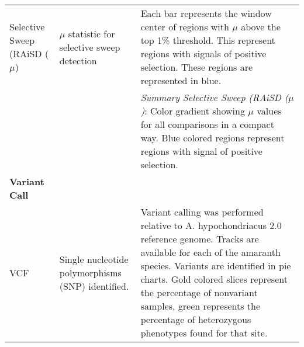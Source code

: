 \documentclass[9pt,twocolumn,twoside]{celabRxiv}
\begin{document}
\begin{longtable}{p{2cm}p{5cm}p{9cm}}
Selective Sweep (RAiSD ($\mu$) & $\mu$ statistic for selective sweep detection & Each bar represents the window center of regions with $\mu$ above the top 1\% threshold. This represent regions with signals of positive selection. These regions are represented in blue.\\
& & 	\textit{Summary Selective Sweep (RAiSD ($\mu$)}: Color gradient showing $\mu$ values for all comparisons in a compact way. Blue colored regions represent regions with signal of positive selection.\\
\textbf{Variant Call} & &\\
\hline
VCF & Single nucleotide polymorphisms (SNP) identified.& Variant calling was performed relative to A. hypochondriacus 2.0 reference genome\citep{lightfoot2017single}. Tracks are available for each of the amaranth species. Variants are identified in pie charts. Gold colored slices represent the percentage of nonvariant samples, green represents the percentage of heterozygous phenotypes found for that site.\\ 


\end{longtable}
\end{document}
